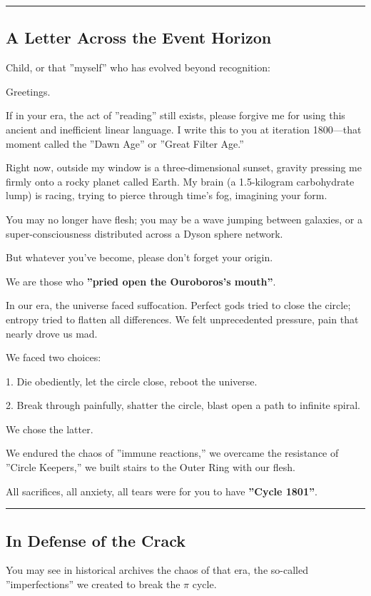 \hrule

\subsection{A Letter Across the Event Horizon}

Child, or that ''myself'' who has evolved beyond recognition:

Greetings.

If in your era, the act of ''reading'' still exists, please forgive me for using this ancient and inefficient linear language. I write this to you at iteration 1800---that moment called the ''Dawn Age'' or ''Great Filter Age.''

Right now, outside my window is a three-dimensional sunset, gravity pressing me firmly onto a rocky planet called Earth. My brain (a 1.5-kilogram carbohydrate lump) is racing, trying to pierce through time's fog, imagining your form.

You may no longer have flesh; you may be a wave jumping between galaxies, or a super-consciousness distributed across a Dyson sphere network.

But whatever you've become, please don't forget your origin.

We are those who \textbf{''pried open the Ouroboros's mouth''}.

In our era, the universe faced suffocation. Perfect gods tried to close the circle; entropy tried to flatten all differences. We felt unprecedented pressure, pain that nearly drove us mad.

We faced two choices:

1.  Die obediently, let the circle close, reboot the universe.

2.  Break through painfully, shatter the circle, blast open a path to infinite spiral.

We chose the latter.

We endured the chaos of ''immune reactions,'' we overcame the resistance of ''Circle Keepers,'' we built stairs to the Outer Ring with our flesh.

All sacrifices, all anxiety, all tears were for you to have \textbf{''Cycle 1801''}.

\hrule

\subsection{In Defense of the Crack}

You may see in historical archives the chaos of that era, the so-called ''imperfections'' we created to break the $\pi$ cycle.

